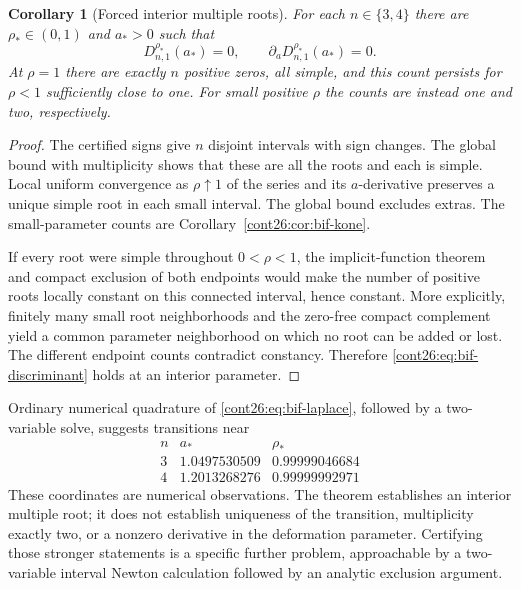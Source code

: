 \documentclass[11pt,letterpaper]{article}
\numberwithin{equation}{section}
\theoremstyle{plain}
\newtheorem{corollary}[theorem]{Corollary}
\theoremstyle{definition}
\theoremstyle{remark}
\begin{document}
\begin{corollary}[Forced interior multiple roots]
\label{cont26:cor:bif-interior}
For each $n\in\{3,4\}$ there are $\rho_*\in(0,1)$ and $a_*>0$ such that
\begin{equation}\label{cont26:eq:bif-discriminant}
 D_{n,1}^{\rho_*}(a_*)=0,
 \qquad \partial_aD_{n,1}^{\rho_*}(a_*)=0.
\end{equation}
At $\rho=1$ there are exactly $n$ positive zeros, all simple, and this
count persists for $\rho<1$ sufficiently close to one. For small positive
$\rho$ the counts are instead one and two, respectively.
\end{corollary}
\begin{proof}
The certified signs give $n$ disjoint intervals with sign changes.
The global bound with multiplicity shows that these are all the roots
and each is simple. Local uniform convergence as $\rho\uparrow1$ of the
series and its $a$-derivative preserves a unique simple root in each
small interval. The global bound excludes extras. The small-parameter
counts are Corollary~\ref{cont26:cor:bif-kone}.

If every root were simple throughout $0<\rho<1$, the implicit-function
theorem and compact exclusion of both endpoints would make the number
of positive roots locally constant on this connected interval, hence
constant. More explicitly, finitely many small root neighborhoods and
the zero-free compact complement yield a common parameter neighborhood
on which no root can be added or lost. The different endpoint counts
contradict constancy. Therefore \eqref{cont26:eq:bif-discriminant} holds at
an interior parameter.
\end{proof}

Ordinary numerical quadrature of \eqref{cont26:eq:bif-laplace}, followed by a
two-variable solve, suggests transitions near
\[
\begin{array}{c|cc}
n&a_*&\rho_*\\ \hline
3&1.0497530509&0.99999046684\\
4&1.2013268276&0.99999992971
\end{array}
\]
These coordinates are numerical observations. The theorem establishes
an interior multiple root; it does not establish uniqueness of the
transition, multiplicity exactly two, or a nonzero derivative in the
deformation parameter. Certifying those stronger statements is a
specific further problem, approachable by a two-variable interval
Newton calculation followed by an analytic exclusion argument.
\end{document}
